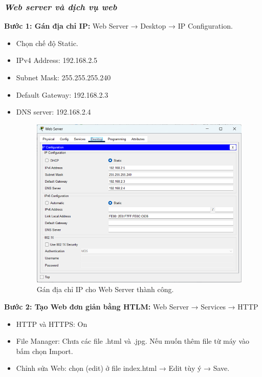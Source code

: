 \documentclass[12pt, a4paper]{article}
\begin{document}
	\subsubsection{\textit{Web server và dịch vụ web}}
	\begin{flushleft}
		\textbf{Bước 1: Gán địa chỉ IP:} Web Server → Desktop → IP Configuration.
		\begin{itemize}[leftmargin=0.75cm]
			\item Chọn chế độ Static.
			\item IPv4 Address: 192.168.2.5
			\item Subnet Mask: 255.255.255.240
			\item Default Gateway: 192.168.2.3
			\item DNS server: 192.168.2.4
			\begin{figure}[H]
				\centering
				\includegraphics[width=1\textwidth]{web_ip.png}
				\caption{Gán địa chỉ IP cho Web Server thành công.}
			\end{figure}
		\end{itemize}
		\newpage
		\textbf{Bước 2: Tạo Web đơn giản bằng HTLM:}  Web Server → Services → HTTP
		\begin{itemize}[leftmargin=0.75cm]
			\item HTTP và HTTPS: On
			\item File Manager: Chưa các file .html và .jpg. Nếu muốn thêm file từ máy vào bấm chọn Import.
			\item Chỉnh sửa Web: chọn (edit) ở file index.html → Edit tùy ý → Save.
			\begin{figure}[H]
				\centering

\end{figure}
\end{itemize}
\end{flushleft}
\end{document}
